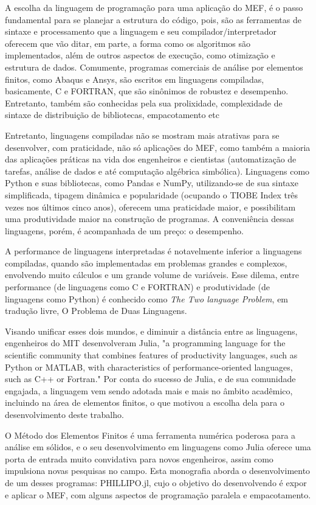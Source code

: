 A escolha da linguagem de programação para uma aplicação do MEF, é o passo fundamental para se planejar a estrutura do código, pois, são as ferramentas de sintaxe e processamento que a linguagem e seu compilador/interpretador oferecem que vão ditar, em parte, a forma como os algoritmos são implementados, além de outros aspectos de execução, como otimização e estrutura de dados. Comumente, programas comerciais de análise por elementos finitos, como Abaqus e Ansys, são escritos em linguagens compiladas, basicamente, C e FORTRAN, que são sinônimos de robustez e desempenho. Entretanto, também são conhecidas pela sua prolixidade, complexidade de sintaxe de distribuição de bibliotecas, empacotamento etc 

Entretanto, linguagens compiladas não se mostram mais atrativas para se desenvolver, com praticidade, não só aplicações do MEF, como também a maioria das aplicações práticas na vida dos engenheiros e cientistas (automatização de tarefas, análise de dados e até computação algébrica simbólica). Linguagens como Python e suas bibliotecas, como Pandas e NumPy, utilizando-se de sua sintaxe simplificada, tipagem dinâmica e popularidade (ocupando o TIOBE Index três vezes nos últimos cinco anos), oferecem uma praticidade maior, e possibilitam uma produtividade maior na construção de programas. A conveniência dessas linguagens, porém, é acompanhada de um preço: o desempenho.

A performance de linguagens interpretadas é notavelmente inferior a linguagens compiladas, quando são implementadas em problemas grandes e complexos, envolvendo muito cálculos e um grande volume de variáveis. Esse dilema, entre performance (de linguagens como C e FORTRAN) e produtividade (de linguagens como Python) é conhecido como \emph{The Two language Problem}, em tradução livre, O Problema de Duas Linguagens.

Visando unificar esses dois mundos, e diminuir a distância entre as linguagens, engenheiros do MIT desenvolveram Julia, "a programming language for the scientific community that combines features of productivity languages, such as Python or MATLAB, with characteristics of performance-oriented languages, such as C++ or Fortran." \cite[tradução livre]{Bezanson} Por conta do sucesso de Julia, e de sua comunidade engajada, a linguagem vem sendo adotada mais e mais no âmbito acadêmico, incluindo na área de elementos finitos, o que motivou a escolha dela para o desenvolvimento deste trabalho.

O Método dos Elementos Finitos é uma ferramenta numérica poderosa para a análise em sólidos, e o seu desenvolvimento em linguagens como Julia oferece uma porta de entrada muito convidativa para novos engenheiros, assim como impulsiona novas pesquisas no campo. Esta monografia aborda o desenvolvimento de um desses programas: PHILLIPO.jl, cujo o objetivo do desenvolvendo é expor e aplicar o MEF, com alguns aspectos de programação paralela e empacotamento.



